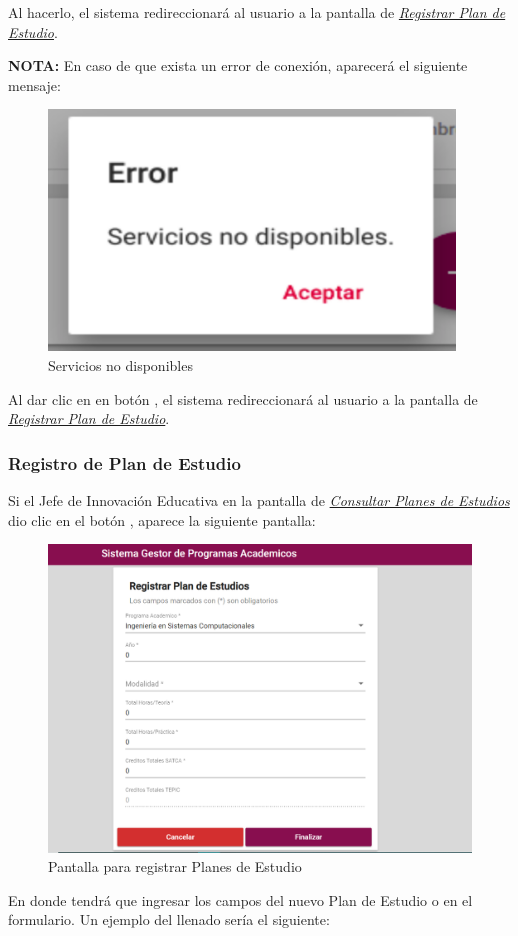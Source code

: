 Al hacerlo, el sistema redireccionará al usuario a la pantalla de \hyperlink{registrarPE}{\textit{Registrar Plan de Estudio}}.


\textbf{NOTA:} En caso de que exista un error de conexión, aparecerá el siguiente mensaje:
	\begin{figure}[!hbtp]
	\centering
	\hypertarget{error}{\includegraphics[width=0.7\linewidth]{images/SP4-GPE/error}}
	\caption{Servicios no disponibles}
	\label{error}
\end{figure}

Al dar clic en en botón , el sistema redireccionará al usuario a la pantalla de \hyperlink{registrarPE}{\textit{Registrar Plan de Estudio}}. 
\newpage
\subsubsection{Registro de Plan de Estudio}
Si el Jefe de Innovación Educativa en la pantalla de \hyperlink{consultarPE}{\textit{Consultar Planes de Estudios}} dio clic en el botón \IUbutton{+}, aparece la siguiente pantalla:

\begin{figure}[!hbtp]
	\centering
	\hypertarget{registrarPE}{\includegraphics[width=0.7\linewidth]{images/SP4-GPE/registrarPE}}
	\caption{Pantalla para registrar Planes de Estudio}
	\label{registrarPE}
\end{figure}
\newpage
En donde tendrá que ingresar los campos del nuevo Plan de Estudio o en el formulario. Un ejemplo del llenado sería el siguiente:

